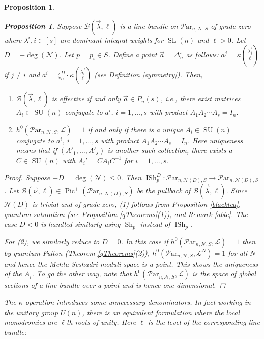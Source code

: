 \documentclass[11pt]{amsart}
\newcommand\op{\operatorname}
\newcommand\Pic{\operatorname{Pic}}
\newcommand\ml{\mathcal{L}}
\newcommand\mn{\mathcal{N}}
\newcommand\Par{\mathcal{P}\text{ar} }
\newtheorem{proposition}[theorem]{Proposition}
\numberwithin{theorem}{subsection}
\begin{document}
{\begin{proposition}
\begin{proposition}\label{kappa}
Suppose $\mathcal{B}(\vec{\lambda},\ell)$ is a line bundle on  $\Par_{n,\mn,S}$ of grade zero where $\lambda^i, i\in[s]$ are dominant integral weights for $\op{SL}(n)$ and $\ell> 0$. Let $D=-\deg(\mn)$. Let $p=p_i\in S$. Define a point $\vec{a}= \Delta_n^s$ as follows: $a^j=\kappa(\frac{\vec{\lambda_j}}{\ell})$  if $j\neq i$ and $a^i=\zeta^D_n\cdot \kappa(\frac{\vec{\lambda_i}}{\ell})$ (see Definition  \ref{symmetry}). Then,
\begin{enumerate}
\item  $\mathcal{B}(\vec{\lambda},\ell)$ is effective if and only $\vec{a}\in P_n(s)$, i.e., there exist matrices $A_i\in \op{SU}(n)$ conjugate to $a^i$, $i=1,\dots,s$ with product $A_1 A_2\cdots A_s=I_n$.
\item  $h^0(\Par_{n,\mn,S},\ml)=1$ if and only if there is a unique $A_i\in \op{SU}(n)$ conjugate to $a^i$, $i=1,\dots,s$  with product $A_1A_2\cdots A_s=I_n$. Here uniqueness means that if $(A'_1,\dots,A'_s)$ is another such collection, there exists a $C\in \op{SU}(n)$ with $A_i'=CA_iC^{-1}$ for $i=1,\dots,s$.
\end{enumerate}
\end{proposition}
\begin{proof}
Suppose $-D=\deg(\mn)\leq 0$. Then $\operatorname{ISh}_p^D: \Par_{n,\mn(D),S}\to \Par_{n,\mn(D),S}$. Let  $\mathcal{B}(\vec{\nu},\ell)\in \Pic^+(\Par_{n,\mn(D),S})$ be the pullback of $\mathcal{B}(\vec{\lambda},\ell)$.  Since $\mn(D)$ is trivial and of grade zero, (1) follows from Proposition \ref{blacktea}, quantum saturation \cite{BHorn}(see Proposition \ref{qTheorems}(1)), and Remark \ref{able}. The case $D<0$ is handled similarly using  $\operatorname{Sh}_p$ instead of  $\operatorname{ISh}_p$.

For (2), we similarly reduce to $D=0$. In this case if $h^0(\Par_{n,\mn,S},\ml)=1$ then by quantum Fulton (Theorem \ref{qTheorems}(2)), $h^0(\Par_{n,\mn,S},\ml^N)=1$ for all $N$ and hence the Mehta-Seshadri moduli space is a point. This shows the uniqueness of the $A_i$. To go the other way, note that  $h^0(\Par_{n,\mn,S},\ml)$ is the space of global sections of  a line bundle over a point and is hence one dimensional.
\end{proof}

The $\kappa$ operation introduces some unnecessary denominators. In fact working in the unitary group $U(n)$, there is an equivalent formulation where the local monodromies are $\ell$th roots of unity. Here $\ell$ is the level of the corresponding line bundle:


\end{proposition}}
\end{document}
